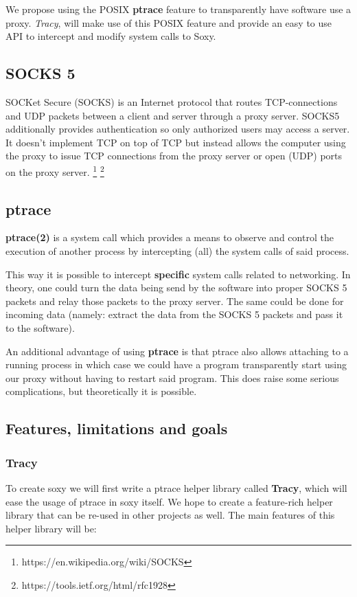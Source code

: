 \documentclass[a4paper]{article}
\begin{document}
We propose using the POSIX \textbf{ptrace} feature to transparently have
software use a proxy. \textit{Tracy}, will make use of this POSIX feature and
provide an easy to use API to intercept and modify system calls to Soxy.

\subsection{SOCKS 5}

SOCKet Secure (SOCKS) is an Internet protocol that routes TCP-connections and
UDP packets between a client and server through a proxy server. SOCKS5
additionally provides authentication so only authorized users may access a
server. It doesn't implement TCP on top of TCP but instead allows the computer using
the proxy to issue TCP connections from the proxy server or open (UDP) ports on the
proxy server.
\footnote{https://en.wikipedia.org/wiki/SOCKS}
\footnote{https://tools.ietf.org/html/rfc1928}

\subsection{ptrace}

\textbf{ptrace(2)} is a system call which provides a means to observe and
control the execution of another process by intercepting (all) the system calls
of said process.

This way it is possible to intercept \textbf{specific} system calls related to
networking. In theory, one could turn the data being send by the software into
proper SOCKS 5 packets and relay those packets to the proxy server. The same
could be done for incoming data (namely: extract the data from the SOCKS 5
packets and pass it to the software).

An additional advantage of using \textbf{ptrace} is that ptrace also allows
attaching to a running process in which case we could have a program
transparently start using our proxy without having to restart said program. This
does raise some serious complications, but theoretically it is possible.

\subsection{Features, limitations and goals}

\subsubsection{Tracy}
To create soxy we will first write a ptrace helper library called
\textbf{Tracy}, which will ease the usage of ptrace in soxy itself.
We hope to create a feature-rich helper library that can be re-used in
other projects as well. The main features of this helper library will be:
\end{document}
